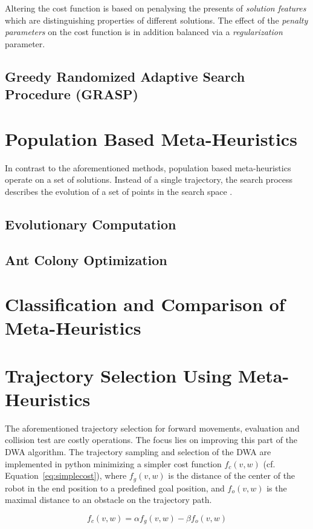 Altering the cost function is based on penalysing the presents of \emph{solution features} which are distinguishing properties of different solutions. The effect of the \emph{penalty parameters} on the cost function is in addition balanced via a \emph{regularization} parameter.  

\subsection{Greedy Randomized Adaptive Search Procedure (GRASP)}

\section{Population Based Meta-Heuristics}
In contrast to the aforementioned methods, population based meta-heuristics operate on a set of solutions. Instead of a single trajectory, the search process describes \grqq the evolution of a set of points in the search space \grqq \cite{blum2003metaheuristics}.  
\subsection{Evolutionary Computation}
\subsection{Ant Colony Optimization}
\section{Classification and Comparison of Meta-Heuristics}

\section{Trajectory Selection Using Meta-Heuristics} \label{sec:trajselmeta}
The aforementioned trajectory selection for forward movements, evaluation and collision test are costly operations. 
The focus lies on improving this part of the DWA algorithm. 
The trajectory sampling and selection of the DWA are implemented in python minimizing a simpler cost function $f_c(v,w)$ (cf. Equation~\ref{eq:simplecost}), where $f_g(v,w)$ is the distance of the center of the robot in the end position to a predefined goal position, and $f_o(v,w)$ is the maximal distance to an obstacle on the trajectory path.

\begin{equation}
   f_c(v,w)=\alpha f_g(v,w) - \beta f_o(v,w)
   \label{eq:simplecost}
\end{equation}

